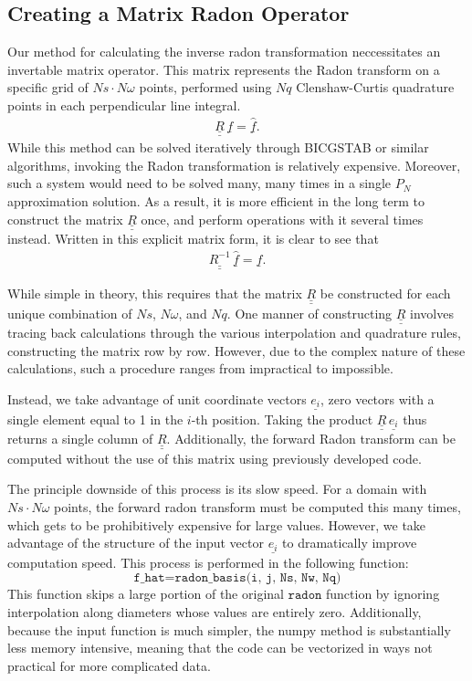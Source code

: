 \documentclass[12pt]{article}
\newcommand{\bunderline}[1]{\underline{#1}}
\renewcommand{\vec}[1]{{\bunderline{#1}}}
\newcommand{\mat}[1]{{\bunderline{\bunderline{#1}}}}
\begin{document}
\subsection*{Creating a Matrix Radon Operator}

Our method for calculating the inverse radon transformation neccessitates an invertable matrix operator. 
This matrix represents the Radon transform on a specific grid of $Ns \cdot N\omega$ points, performed using $Nq$ Clenshaw-Curtis quadrature points in each perpendicular line integral.
\begin{align*}
	\mat{R}\,\vec{f} = \vec{\hat{f}}.
\end{align*}
While this method can be solved iteratively through BICGSTAB or similar algorithms, invoking the Radon transformation is relatively expensive. 
Moreover, such a system would need to be solved many, many times in a single $P_N$ approximation solution.
As a result, it is more efficient in the long term to construct the matrix $\mat{R}$ once, and perform operations with it several times instead. 
Written in this explicit matrix form, it is clear to see that 
\begin{align*}
	\mat{R^{-1}}\,\vec{\hat{f}} = \vec{f}.
\end{align*}

While simple in theory, this requires that the matrix $\mat{R}$ be constructed for each unique combination of $Ns$, $N\omega$, and $Nq$.
One manner of constructing $\mat{R}$ involves tracing back  calculations through the various interpolation and quadrature rules, constructing the matrix row by row.
However, due to the complex nature of these calculations, such a procedure ranges from impractical to impossible.

Instead, we take advantage of unit coordinate vectors $\vec{e_i}$, zero vectors with a single element equal to 1 in the $i$-th position.
Taking the product $\mat{R}\,\vec{e_i}$ thus returns a single column of $\mat{R}$.
Additionally, the forward Radon transform can be computed without the use of this matrix using previously developed code.

The principle downside of this process is its slow speed. For a domain with $Ns\cdot N\omega$ points, the forward radon transform must be computed this many times, which gets to be prohibitively expensive for large values.
However, we take advantage of the structure of the input vector $\vec{e_i}$ to dramatically improve computation speed.
This process is performed in the following function:
$$\texttt{f\_hat} = \texttt{radon\_basis(i, j, Ns, Nw, Nq)}$$
This function skips a large portion of the original $\texttt{radon}$ function by ignoring interpolation along diameters whose values are entirely zero.
Additionally, because the input function is much simpler, the numpy method is substantially less memory intensive, meaning that the code can be vectorized in ways not practical for more complicated data.
\end{document}
